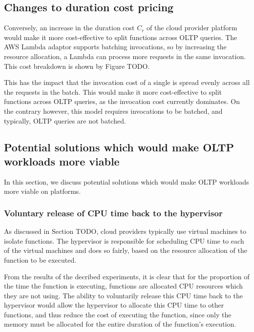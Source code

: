 \subsection{Changes to duration cost pricing}
Conversely, an increase in the duration cost $C_r$ of the cloud provider platform would make it more cost-effective to split functions across OLTP queries. The \faaasc{} AWS Lambda adaptor supports batching invocations, so by increasing the resource allocation, a Lambda can process more requests in the same invocation. This cost breakdown is shown by Figure TODO.

This has the impact that the invocation cost of a single is spread evenly across all the requests in the batch. This would make it more cost-effective to split functions across OLTP queries, as the invocation cost currently dominates. On the contrary however, this model requires invocations to be batched, and typically, OLTP queries are not batched.

\subsection{Potential solutions which would make OLTP workloads more viable}
In this section, we discuss potential solutions which would make OLTP workloads more viable on \faas{} platforms.

\subsubsection{Voluntary release of CPU time back to the hypervisor}
As discussed in Section TODO, cloud providers typically use virtual machines to isolate functions. The hypervisor is responsible for scheduling CPU time to each of the virtual machines and does so fairly, based on the resource allocation of the function to be executed.

From the results of the decribed experiments, it is clear that for the proportion of the time the function is executing, functions are allocated CPU resources which they are not using. The ability to voluntarily release this CPU time back to the hypervisor would allow the hypervisor to allocate this CPU time to other functions, and thus reduce the cost of executing the function, since only the memory must be allocated for the entire duration of the function's execution.

